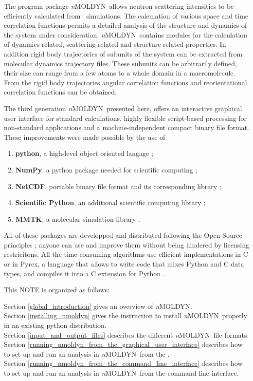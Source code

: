 \documentclass[a4paper,11pt]{report}
\newcommand{\NMOLDYN}{\textit{n}MOLDYN}
\begin{document}
The program package \NMOLDYN\ allows neutron scattering intensities to be efficiently calculated from \MD\ simulations. 
The calculation of various space and time correlation functions permits a detailed analysis of the structure and dynamics 
of the system under consideration.  \NMOLDYN\ contains modules for the calculation of dynamics-related, scattering-related and 
structure-related properties. In addition rigid body trajectories of subunits of the system can be extracted from molecular 
dynamics trajectory files. These subunits can be arbitrarily defined, their size can range from a few atoms to a whole 
domain in a macromolecule. From the rigid body trajectories angular correlation functions and reorientational correlation 
functions can be obtained.

The third generation \NMOLDYN\ presented here, offers an interactive graphical user interface for standard 
calculations, highly flexible script-based processing for non-standard applications and a machine-independent 
compact binary file format. These improvements were made possible by the use of
\begin{enumerate}
\item \textbf{python}, a high-level object oriented langage \cite{vanRossum,python};
\item \textbf{NumPy}, a python package needed for scientific computing \cite{NumPy};
\item \textbf{NetCDF}, portable binary file format and its corresponding library \cite{NetCDF,Davies};
\item \textbf{Scientific Python}, an additional scientific computing library \cite{Scientific1,Scientific2};
\item \textbf{MMTK}, a molecular simulation library \cite{Hinsen:2000,MMTK}.
\end{enumerate} 
All of these packages are developped and distributed following the Open Source principles \cite{OpenSource}; anyone can use 
and improve them without being hindered by licensing restricitons.
All the time-consuming algorithms use efficient implementations in C or in Pyrex, a language that allows to 
write code that mixes Python and C data types, and compiles it into a C extension for Python \cite{Pyrex}.

This NOTE is organized as follows: 

Section \ref{global_introduction} gives an overview of \NMOLDYN.\\
Section \ref{installing_nmoldyn} gives the instruction to install \NMOLDYN\ properly in an existing python distribution.\\
Section \ref{input_and_output_files} describes the different \NMOLDYN\ file formats.\\
Section \ref{running_nmoldyn_from_the_graphical_user_interface} describes how to set up and run an analysis in \NMOLDYN\ from the \GUI .\\
Section \ref{running_nmoldyn_from_the_command_line_interface} describes how to set up and run an analysis in \NMOLDYN\ from the command-line interface.
\end{document}
